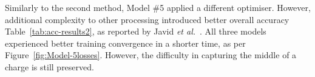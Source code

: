 
%
%

%
%
Similarly to the second method, Model \#5 applied a different optimiser.
However, additional complexity to other processing introduced better overall accuracy Table~\ref{tab:acc-results2}, as reported by Javid \textit{et al.}~\cite{javid_adaptive_2020}.
All three models experienced better training convergence in a shorter time, as per Figure~\ref{fig:Model-5losses}.
However, the difficulty in capturing the middle of a charge is still preserved.

